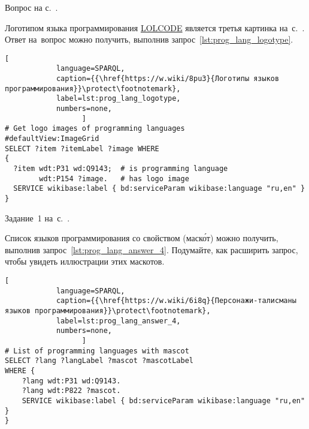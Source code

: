 \begin{task}
    \label{answer:prog_lang_2}
    \AnswerBackref Вопрос на с.~\pageref{question:prog_lang_2}.

    Логотипом языка программирования 
    \href{https://ru.wikipedia.org/wiki/LOLCODE}{LOLCODE} является третья картинка на~с.~\pageref{question:prog_lang_2}. 
    Ответ на~вопрос можно получить, выполнив запрос~\ref{lst:prog_lang_logotype}. 
\begin{lstlisting}[
            language=SPARQL, 
            caption={{\href{https://w.wiki/8pu3}{Логотипы языков программирования}}\protect\footnotemark}, 
            label=lst:prog_lang_logotype,
            numbers=none,
                  ]
# Get logo images of programming languages
#defaultView:ImageGrid
SELECT ?item ?itemLabel ?image WHERE
{
  ?item wdt:P31 wd:Q9143;  # is programming language
        wdt:P154 ?image.   # has logo image
  SERVICE wikibase:label { bd:serviceParam wikibase:language "ru,en" }
}
\end{lstlisting}
\end{task}



\begin{task}
    \label{answer:prog_langs_4}
    \AnswerBackref Задание~1 на~с.~\pageref{prog_lang_test}.

    Список языков программирования со свойством  (маск\'{о}т)
    можно получить, выполнив запрос~\ref{lst:prog_lang_answer_4}. 
    Подумайте, как расширить запрос, чтобы увидеть иллюстрации этих маскотов.

\begin{lstlisting}[
            language=SPARQL, 
            caption={{\href{https://w.wiki/6i8q}{Персонажи-талисманы языков программирования}}\protect\footnotemark}, 
            label=lst:prog_lang_answer_4,
            numbers=none,
                  ]
# List of programming languages with mascot
SELECT ?lang ?langLabel ?mascot ?mascotLabel
WHERE {
    ?lang wdt:P31 wd:Q9143.
    ?lang wdt:P822 ?mascot.
    SERVICE wikibase:label { bd:serviceParam wikibase:language "ru,en" }
}
\end{lstlisting}
\end{task}



